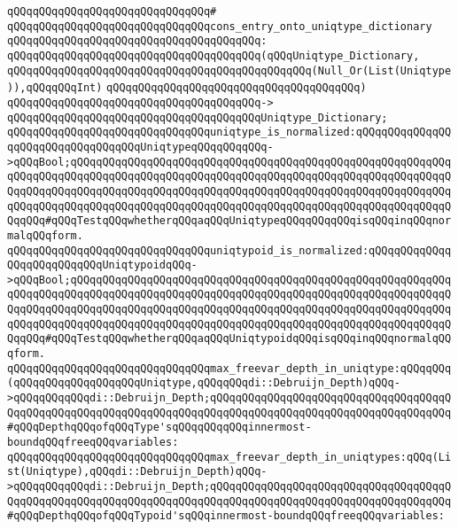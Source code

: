 \verb|qQQqqQQqqQQqqQQqqQQqqQQqqQQqqQQq#|\newline
\verb|qQQqqQQqqQQqqQQqqQQqqQQqqQQqqQQqcons_entry_onto_uniqtype_dictionary|\newline
\verb|qQQqqQQqqQQqqQQqqQQqqQQqqQQqqQQqqQQqqQQq:|\newline
\verb|qQQqqQQqqQQqqQQqqQQqqQQqqQQqqQQqqQQqqQQq(qQQqUniqtype_Dictionary,|\newline
\verb|qQQqqQQqqQQqqQQqqQQqqQQqqQQqqQQqqQQqqQQqqQQqqQQq(Null_Or(List(Uniqtype)),qQQqqQQqInt)|\newline
\verb|qQQqqQQqqQQqqQQqqQQqqQQqqQQqqQQqqQQqqQQq)|\newline
\verb|qQQqqQQqqQQqqQQqqQQqqQQqqQQqqQQqqQQqqQQq->|\newline
\verb|qQQqqQQqqQQqqQQqqQQqqQQqqQQqqQQqqQQqqQQqUniqtype_Dictionary;|\newline
\newline
\verb|qQQqqQQqqQQqqQQqqQQqqQQqqQQqqQQquniqtype_is_normalized:qQQqqQQqqQQqqQQqqQQqqQQqqQQqqQQqqQQqUniqtypeqQQqqQQqqQQq->qQQqBool;qQQqqQQqqQQqqQQqqQQqqQQqqQQqqQQqqQQqqQQqqQQqqQQqqQQqqQQqqQQqqQQqqQQqqQQqqQQqqQQqqQQqqQQqqQQqqQQqqQQqqQQqqQQqqQQqqQQqqQQqqQQqqQQqqQQqqQQqqQQqqQQqqQQqqQQqqQQqqQQqqQQqqQQqqQQqqQQqqQQqqQQqqQQqqQQqqQQqqQQqqQQqqQQqqQQqqQQqqQQqqQQqqQQqqQQqqQQqqQQqqQQqqQQqqQQqqQQqqQQqqQQqqQQqqQQqqQQq#qQQqTestqQQqwhetherqQQqaqQQqUniqtypeqQQqqQQqqQQqisqQQqinqQQqnormalqQQqform.|\newline
\verb|qQQqqQQqqQQqqQQqqQQqqQQqqQQqqQQquniqtypoid_is_normalized:qQQqqQQqqQQqqQQqqQQqqQQqqQQqUniqtypoidqQQq->qQQqBool;qQQqqQQqqQQqqQQqqQQqqQQqqQQqqQQqqQQqqQQqqQQqqQQqqQQqqQQqqQQqqQQqqQQqqQQqqQQqqQQqqQQqqQQqqQQqqQQqqQQqqQQqqQQqqQQqqQQqqQQqqQQqqQQqqQQqqQQqqQQqqQQqqQQqqQQqqQQqqQQqqQQqqQQqqQQqqQQqqQQqqQQqqQQqqQQqqQQqqQQqqQQqqQQqqQQqqQQqqQQqqQQqqQQqqQQqqQQqqQQqqQQqqQQqqQQqqQQqqQQqqQQqqQQqqQQqqQQq#qQQqTestqQQqwhetherqQQqaqQQqUniqtypoidqQQqisqQQqinqQQqnormalqQQqform.|\newline
\newline
\verb|qQQqqQQqqQQqqQQqqQQqqQQqqQQqqQQqmax_freevar_depth_in_uniqtype:qQQqqQQq(qQQqqQQqqQQqqQQqqQQqUniqtype,qQQqqQQqdi::Debruijn_Depth)qQQq->qQQqqQQqqQQqdi::Debruijn_Depth;qQQqqQQqqQQqqQQqqQQqqQQqqQQqqQQqqQQqqQQqqQQqqQQqqQQqqQQqqQQqqQQqqQQqqQQqqQQqqQQqqQQqqQQqqQQqqQQqqQQqqQQqqQQq#qQQqDepthqQQqofqQQqType'sqQQqqQQqqQQqinnermost-boundqQQqfreeqQQqvariables:|\newline
\verb|qQQqqQQqqQQqqQQqqQQqqQQqqQQqqQQqmax_freevar_depth_in_uniqtypes:qQQq(List(Uniqtype),qQQqdi::Debruijn_Depth)qQQq->qQQqqQQqqQQqdi::Debruijn_Depth;qQQqqQQqqQQqqQQqqQQqqQQqqQQqqQQqqQQqqQQqqQQqqQQqqQQqqQQqqQQqqQQqqQQqqQQqqQQqqQQqqQQqqQQqqQQqqQQqqQQqqQQqqQQq#qQQqDepthqQQqofqQQqTypoid'sqQQqinnermost-boundqQQqfreeqQQqvariables:|\newline
